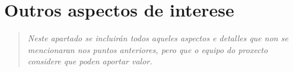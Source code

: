 \documentclass[DIV=calc,paper=a4,fontsize=11pt,onecolumn]{scrartcl} %
\newcommand{\hint}[1]{\begin{quote}\itshape #1 \end{quote}}
\begin{document}
\section{Outros aspectos de interese}

\hint{Neste apartado se incluirán todos aqueles aspectos e detalles que non se
  mencionaran nos puntos anteriores, pero que o equipo do proxecto considere que
  poden aportar valor.}
\end{document}
